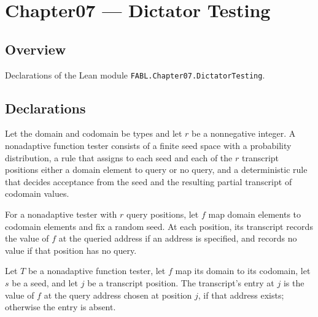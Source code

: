 \chapter{Chapter07 — Dictator Testing}
\section{Overview}

Declarations of the Lean module \texttt{FABL.Chapter07.DictatorTesting}.

\section{Declarations}

\begin{definition}
\label{FABL.NonadaptiveFunctionTester}
\leanok
Let the domain and codomain be types and let $r$ be a nonnegative integer. A nonadaptive
function tester consists of a finite seed space with a probability distribution, a rule
that assigns to each seed and each of the $r$ transcript positions either a domain
element to query or no query, and a deterministic rule that decides acceptance from the
seed and the resulting partial transcript of codomain values.
\end{definition}

\begin{definition}
\label{FABL.NonadaptiveFunctionTester.transcript}
\leanok
{}
For a nonadaptive tester with $r$ query positions, let $f$ map domain elements to
codomain elements and fix a random seed. At each position, its transcript records the
value of $f$ at the queried address if an address is specified, and records no value if
that position has no query.
\end{definition}

\begin{theorem}
\label{FABL.NonadaptiveFunctionTester.transcript_apply}
\leanok
{}
Let $T$ be a nonadaptive function tester, let $f$ map its domain to its codomain, let
$s$ be a seed, and let $j$ be a transcript position. The transcript’s entry at $j$ is
the value of $f$ at the query address chosen at position $j$, if that address exists;
otherwise the entry is absent.
\end{theorem}

